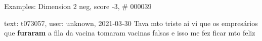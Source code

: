 \begin{frame}{Examples: Dimension 2 neg, score -3, \# 000039}
\footnotesize
\begin{alertblock}{text: t073057, user: unknown, 2021-03-30}
Tava mto triste ai vi que os empresários que \textbf{furaram} a fila da vacina 
tomaram vacinas falsas e isso me fez ficar mto feliz 
\end{alertblock}
\end{frame}
